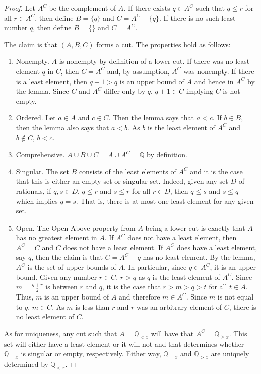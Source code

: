 \documentclass[12pt]{article}
\newcommand{\qcut}[2][x]{\ensuremath{\mathbb{Q}_{#2 #1}}}
\newcommand{\qlt}[1][x]{\qcut[#1]{<}}
\newcommand{\qeq}[1][x]{\qcut[#1]{=}}
\newcommand{\qgt}[1][x]{\qcut[#1]{>}}
\newcommand{\qgeq}[1][x]{\qcut[#1]{\geq}}
\begin{document}
\begin{proof}
    Let $A^C$ be the complement of $A$. If there exists $q \in A^C$ such that $q \leq r$ for all $r \in A^C$, then define $B = \{q\}$ and $C = A^C - \{q\}$. If there is no such least number $q$, then define $B = \{\}$ and $C = A^C$. 

    The claim is that $(A, B, C)$ forms a cut. The properties hold as follows:

    \begin{enumerate}
        \item Nonempty. $A$ is nonempty by definition of a lower cut. If there was no least element $q$ in $C$, then $C = A^C$ and, by assumption, $A^C$ was nonempty. If there is a least element, then $q+1 > q$ is an upper bound of $A$ and hence in $A^C$ by the lemma. Since $C$ and $A^C$ differ only by $q$, $q+1 \in C$ implying $C$ is not empty. 
        \item Ordered. Let $a \in A$ and $c \in C$. Then the lemma says that $ a< c$. If $b \in B$, then the lemma also says that $a < b$. As $b$ is the least element of $A^C$ and $b \notin C$, $ b < c$. 
        \item Comprehensive. $A \cup B \cup C = A \cup A^C = \mathbb{Q}$ by definition. 
        \item Singular. The set $B$ consists of the least elements of $A^C$ and it is the case that this is either an empty set or singular set. Indeed, given any set $D$ of rationals, if $q, s \in D$, $q \leq r$ and $s \leq r$ for all $r \in D$, then $q \leq s$ and $s \leq q$ which implies $q = s$. That is, there is at most one least element for any given set. 
        \item Open. The Open Above property from $A$ being a lower cut is exactly that $A$ has no greatest element in $A$. If $A^C$ does not have a least element, then $A^C = C$ and $C$ does not have a least element. If $A^C$ does have a least element, say $q$, then the claim is that $C= A^C - {q}$ has no least element. By the lemma, $A^C$ is the set of upper bounds of $A$. In particular, since $q \in A^C$, it is an upper bound. Given any number $r \in C$, $r > q$ as $q$ is the least element of $A^C$. Since $m = \frac{q+r}{2}$ is between $r$ and $q$, it is the case that $r > m > q > t$ for all $t \in A$. Thus, $m$ is an upper bound of $A$ and therefore $m \in A^C$. Since $m$ is not equal to $q$, $m \in C$. As $m$ is less than $r$ and $r$ was an arbitrary element of $C$, there is no least element of $C$. 
    \end{enumerate}

    As for uniqueness, any cut such that $A = \qlt$ will have that $A^C = \qgeq$. This set will either have a least element or it will not and that determines whether $\qeq$ is singular or empty, respectively. Either way, $\qeq$ and $\qgt$ are uniquely determined by $\qlt$. 
\end{proof}
\end{document}
